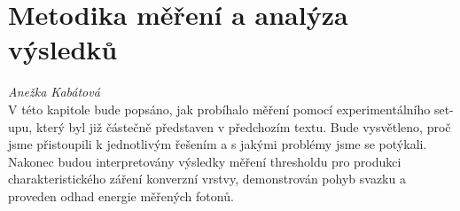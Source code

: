 \newpage

\chapter{Metodika měření a analýza výsledků}
\label{kapAnezka}

\textit{Anežka Kabátová}\\
V této kapitole bude popsáno, jak probíhalo měření pomocí experimentálního set-upu, který byl již částečně představen v předchozím textu. Bude vysvětleno, proč jsme přistoupili k jednotlivým řešením a s jakými problémy jsme se potýkali. Nakonec budou interpretovány výsledky měření thresholdu pro produkci charakteristického záření konverzní vrstvy, demonstrován pohyb svazku a proveden odhad energie měřených fotonů.\\

